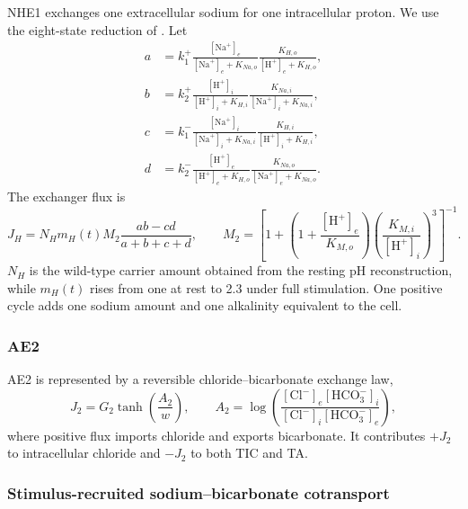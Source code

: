 \documentclass[11pt]{article}
\newcommand{\Na}{\mathrm{Na}^{+}}
\newcommand{\Cl}{\mathrm{Cl}^{-}}
\newcommand{\HCO}{\mathrm{HCO}_{3}^{-}}
\begin{document}
NHE1 exchanges one extracellular sodium for one intracellular proton. We use the eight-state reduction of \citet{Cha2009}. Let
\begin{align*}
 a&=k_1^+\frac{[\Na]_e}{[\Na]_e+K_{Na,o}}
       \frac{K_{H,o}}{[\mathrm H^+]_e+K_{H,o}},\\
 b&=k_2^+\frac{[\mathrm H^+]_i}{[\mathrm H^+]_i+K_{H,i}}
       \frac{K_{Na,i}}{[\Na]_i+K_{Na,i}},\\
 c&=k_1^-\frac{[\Na]_i}{[\Na]_i+K_{Na,i}}
       \frac{K_{H,i}}{[\mathrm H^+]_i+K_{H,i}},\\
 d&=k_2^-\frac{[\mathrm H^+]_e}{[\mathrm H^+]_e+K_{H,o}}
       \frac{K_{Na,o}}{[\Na]_e+K_{Na,o}}.
\end{align*}
The exchanger flux is
\begin{equation}
    J_H=N_H m_H(t) M_2\frac{ab-cd}{a+b+c+d},
    \qquad
    M_2=\left[1+\left(1+\frac{[\mathrm H^+]_e}{K_{M,o}}\right)
    \left(\frac{K_{M,i}}{[\mathrm H^+]_i}\right)^3\right]^{-1}.
    \label{eq:nhe1}
\end{equation}
$N_H$ is the wild-type carrier amount obtained from the resting pH reconstruction, while $m_H(t)$ rises from one at rest to 2.3 under full stimulation. One positive cycle adds one sodium amount and one alkalinity equivalent to the cell.

\subsubsection{AE2}

AE2 is represented by a reversible chloride--bicarbonate exchange law,
\begin{equation*}
    J_2=G_2\tanh\!\left(\frac{A_2}{w}\right),
    \qquad
    A_2=\log\!\left(\frac{[\Cl]_e[\HCO]_i}{[\Cl]_i[\HCO]_e}\right),
\end{equation*}
where positive flux imports chloride and exports bicarbonate. It contributes $+J_2$ to intracellular chloride and $-J_2$ to both TIC and TA.

\subsubsection{Stimulus-recruited sodium--bicarbonate cotransport}
\label{sec:nbc}
\end{document}
